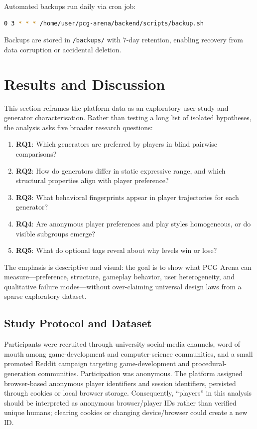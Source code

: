 \documentclass[11pt,a4paper]{article}
\theoremstyle{plain}
\theoremstyle{definition}
\theoremstyle{remark}
\begin{document}
Automated backups run daily via cron job:
\begin{lstlisting}[language=bash]
0 3 * * * /home/user/pcg-arena/backend/scripts/backup.sh
\end{lstlisting}

Backups are stored in \texttt{/backups/} with 7-day retention, enabling recovery from data corruption or accidental deletion.

\section{Results and Discussion}
\label{sec:results}

This section reframes the platform data as an exploratory user study and generator characterisation. Rather than testing a long list of isolated hypotheses, the analysis asks five broader research questions:

\begin{enumerate}
    \item \textbf{RQ1}: Which generators are preferred by players in blind pairwise comparisons?
    \item \textbf{RQ2}: How do generators differ in static expressive range, and which structural properties align with player preference?
    \item \textbf{RQ3}: What behavioral fingerprints appear in player trajectories for each generator?
    \item \textbf{RQ4}: Are anonymous player preferences and play styles homogeneous, or do visible subgroups emerge?
    \item \textbf{RQ5}: What do optional tags reveal about why levels win or lose?
\end{enumerate}

The emphasis is descriptive and visual: the goal is to show what PCG Arena can measure---preference, structure, gameplay behavior, user heterogeneity, and qualitative failure modes---without over-claiming universal design laws from a sparse exploratory dataset.

\subsection{Study Protocol and Dataset}
\label{subsec:study-protocol-dataset}

Participants were recruited through university social-media channels, word of mouth among game-development and computer-science communities, and a small promoted Reddit campaign targeting game-development and procedural-generation communities. Participation was anonymous. The platform assigned browser-based anonymous player identifiers and session identifiers, persisted through cookies or local browser storage. Consequently, ``players'' in this analysis should be interpreted as anonymous browser/player IDs rather than verified unique humans; clearing cookies or changing device/browser could create a new ID.
\end{document}
